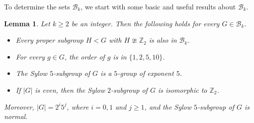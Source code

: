 \documentclass[12pt,a4paper]{article}
\newtheorem{lem}[thm]{Lemma}
\def \geq {\geqslant}
\begin{document}
	To determine the sets $\mathcal{B}_k$, we start with some basic and useful results about $\mathcal{B}_k$.	
	
	\begin{lem}\label{basic}
		Let $k\geq 2$ be an integer.
		Then the following holds for every $G\in\mathcal{B}_k$.
		\begin{itemize}
			\item[$1)$] Every proper subgroup $H< G$ with $H\ncong \mathbb{Z}_2$ is also in $\mathcal{B}_k$.
			\item[$2)$] For every $g\in G$, the order of $g$ is in $\{1,2,5,10\}$.
				\item[$3)$] The Sylow $5$-subgroup of $G$ is a $5$-group of exponent $5$.
			\item[$4)$] If $|G|$ is even, then the Sylow $2$-subgroup of $G$ is isomorphic to $\mathbb{Z}_2$.
		
		\end{itemize}
		
		Moreover, $|G|=2^i5^j$, where $i=0,1$ and $j\geq 1$, and the Sylow $5$-subgroup of $G$ is normal. 
	\end{lem}
\end{document}
